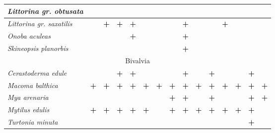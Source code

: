 \begin{footnotesize}
\begin{longtable}{|p{2.1cm}|p{0.38cm}p{0.38cm}|p{0.38cm}p{0.38cm}|p{0.38cm}p{0.38cm}|p{0.35cm}p{0.35cm}p{0.35cm}|p{1cm}|p{0.5cm}p{0.5cm}|p{1cm}|p{1cm}|}
{\it Littorina gr. obtusata}    &           &           &           &           &           &           &          &          &          &                 &          &          &          &            \\  \hline
{\it Littorina gr. saxatilis}   &           & \textbf{+}        & \textbf{+}        & \textbf{+}        &           &           &          & \textbf{+}       &          &                 & \textbf{+}       &          &          &            \\  \hline
{\it Onoba aculeas}             &           &           &           & \textbf{+}        &           &           &          & \textbf{+}       &          &                 &          &          &          &            \\  \hline
{\it Skineopsis planorbis}      &           &           &           &           &           &           &          & \textbf{+}       &          &                 &          &          &          &            \\ \hline
\multicolumn{15}{|c|}{Bivalvia} \\ \hline
{\it Cerastoderma edule}        &           &           & \textbf{+}        & \textbf{+}        &           &           &          & \textbf{+}       &          & \textbf{+}              &          &          & \textbf{+}       &            \\  \hline
{\it Macoma balthica}           & \textbf{+}        & \textbf{+}        & \textbf{+}        & \textbf{+}        & \textbf{+}        & \textbf{+}        & \textbf{+}       & \textbf{+}       & \textbf{+}       & \textbf{+}              & \textbf{+}       & \textbf{+}       & \textbf{+}       & \textbf{+}         \\  \hline
{\it Mya arenaria}              &           &           &           &           &           &           & \textbf{+}       & \textbf{+}       &          & \textbf{+}              &          &          & \textbf{+}       & \textbf{+}         \\  \hline
{\it Mytilus edulis}            & \textbf{+}        & \textbf{+}        & \textbf{+}        & \textbf{+}        & \textbf{+}        &           & \textbf{+}       & \textbf{+}       & \textbf{+}       & \textbf{+}              & \textbf{+}       & \textbf{+}       & \textbf{+}       &            \\  \hline
{\it Turtonia minuta}           &           &           &           &           &           &           &          &          &          &                 &          &          & \textbf{+}       &           \\ \hline
\end{longtable}
\end{footnotesize}


